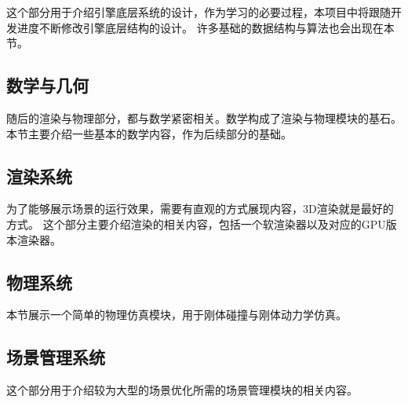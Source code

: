这个部分用于介绍引擎底层系统的设计，作为学习的必要过程，本项目中将跟随开发进度不断修改引擎底层结构的设计。
许多基础的数据结构与算法也会出现在本节。

\maketitle
\subsection{数学与几何}

随后的渲染与物理部分，都与数学紧密相关。数学构成了渲染与物理模块的基石。
本节主要介绍一些基本的数学内容，作为后续部分的基础。

\maketitle
\subsection{渲染系统}

为了能够展示场景的运行效果，需要有直观的方式展现内容，3D渲染就是最好的方式。
这个部分主要介绍渲染的相关内容，包括一个软渲染器以及对应的GPU版本渲染器。

\maketitle
\subsection{物理系统}

本节展示一个简单的物理仿真模块，用于刚体碰撞与刚体动力学仿真。

\maketitle
\subsection{场景管理系统}

这个部分用于介绍较为大型的场景优化所需的场景管理模块的相关内容。
